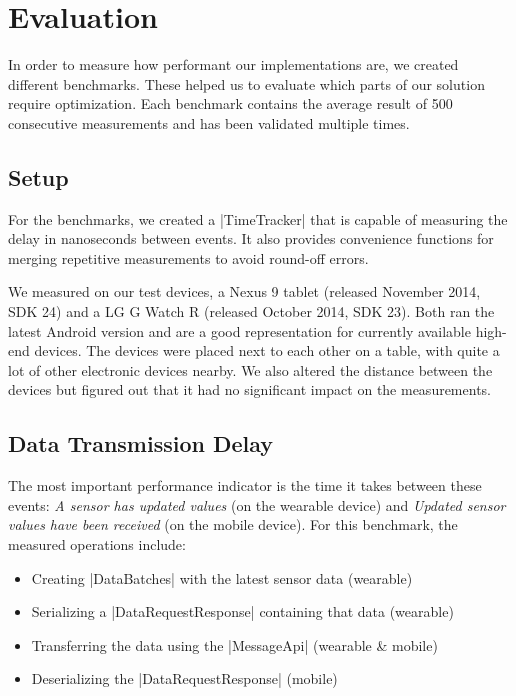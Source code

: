 \section{Evaluation}
\label{sec:evaluation}

In order to measure how performant our implementations are, we created different benchmarks.
These helped us to evaluate which parts of our solution require optimization.
Each benchmark contains the average result of 500 consecutive measurements and has been validated multiple times.

\subsection{Setup}
For the benchmarks, we created a |TimeTracker|\cite{sensordatalogger:timetracker} that is capable of measuring the delay in nanoseconds between events. It also provides convenience functions for merging repetitive measurements to avoid round-off errors.

We measured on our test devices, a Nexus 9 tablet (released November 2014, SDK 24) and a LG G Watch R (released October 2014, SDK 23). Both ran the latest Android version and are a good representation for currently available high-end devices.
The devices were placed next to each other on a table, with quite a lot of other electronic devices nearby.
We also altered the distance between the devices but figured out that it had no significant impact on the measurements.

\subsection{Data Transmission Delay}
The most important performance indicator is the time it takes between these events: \textit{A sensor has updated values} (on the wearable device) and \textit{Updated sensor values have been received} (on the mobile device). For this benchmark, the measured operations include:

\begin{itemize}[noitemsep]
    \item Creating |DataBatches|\cite{sensordatalogger:databatch} with the latest sensor data (wearable)
    \item Serializing a |DataRequestResponse|\cite{sensordatalogger:datarequestresponse} containing that data (wearable)
    \item Transferring the data using the |MessageApi|\cite{androiddocs:messageapi} (wearable \& mobile)
    \item Deserializing the |DataRequestResponse| (mobile)
\end{itemize}

